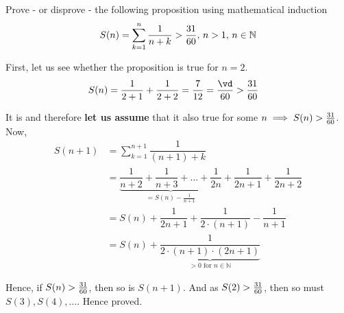 

\DIVIDE{}\vc
{}\vc\vd

\question Prove - or disprove - the following proposition using mathematical induction 
\[ S(n) = \sum_{k=1}^n\dfrac{1}{n + k} > \dfrac{31}{60},\,n > 1,\, n\in\mathbb{N} \]

\watchout
\insertQR{}

\begin{solution}
  First, let us see whether the proposition is true for $n=2$.
  \begin{align}
    S(n) &= \dfrac{1}{2+1} + \dfrac{1}{2+2} = \dfrac{7}{12} = \dfrac\vd\vb > \dfrac\va\vb
  \end{align}

  It is and therefore \textbf{let us assume} that it also true for some $n\implies S(n) > \frac{31}{60}$. 
  Now, 
  \begin{align}
    S(n+1) &= \sum_{k=1}^{n+1}\dfrac{1}{(n+1) + k} \\ 
           &= \underbrace{\dfrac{1}{n+2} + \dfrac{1}{n+3} + \ldots + \dfrac{1}{2n}}_{= S(n) - \frac{1}{n+1}} 
           + \dfrac{1}{2n+1} + \dfrac{1}{2n + 2 } \\
           &= S(n) + \dfrac{1}{2n+1} + \dfrac{1}{2\cdot (n+1)} - \dfrac{1}{n+1} \\
           &= S(n) + \underbrace{\dfrac{1}{2\cdot(n+1)\cdot(2n+1)}}_{ > 0\text{ for } n\in\mathbb{N}}
  \end{align}

  Hence, if $S(n) > \frac{31}{60}$, then so is $S(n+1)$. And as $S(2) > \frac{31}{60}$, then so 
  must $S(3), S(4),\ldots$. Hence proved.
\end{solution}

